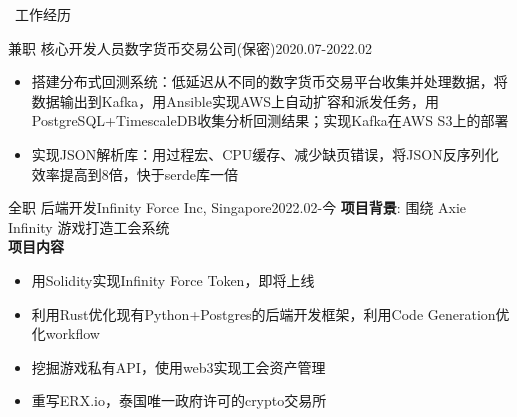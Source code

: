 \documentclass[UTF8]{resume}
\begin{document}
\begin{rSection}{\faBriefcase~工作经历}
\begin{rExperience}{兼职 核心开发人员}{数字货币交易公司(保密)}{2020.07-2022.02}
\begin{itemize}
            \item 搭建分布式回测系统：低延迟从不同的数字货币交易平台收集并处理数据，将数据输出到Kafka，用Ansible实现AWS上自动扩容和派发任务，用PostgreSQL+TimescaleDB收集分析回测结果；实现Kafka在AWS S3上的部署
            \item 实现JSON解析库：用过程宏、CPU缓存、减少缺页错误，将JSON反序列化效率提高到8倍，快于serde库一倍 
        \end{itemize}
    \end{rExperience}
    \begin{rExperience}{全职 后端开发}{Infinity Force Inc, Singapore}{2022.02-今}
        \textbf{项目背景}:
        围绕 Axie Infinity 游戏打造工会系统\\
        \textbf{项目内容}
        \begin{itemize}
            \itemsep -0.5em \vspace{-0.5em}
            \item 用Solidity实现Infinity Force Token，即将上线
            \item 利用Rust优化现有Python+Postgres的后端开发框架，利用Code Generation优化workflow
            \item 挖掘游戏私有API，使用web3实现工会资产管理
            \item 重写ERX.io，泰国唯一政府许可的crypto交易所 
        \end{itemize}
    \end{rExperience}
\end{rSection}
\end{document}
